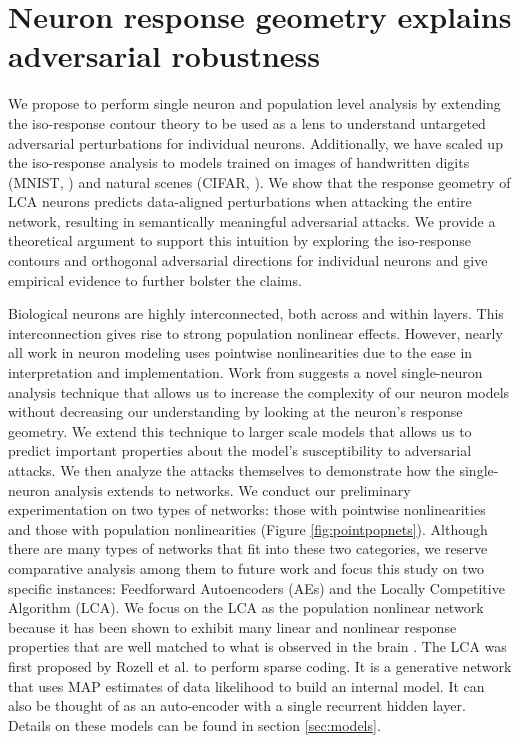 \section{Neuron response geometry explains adversarial robustness}\label{neuron}
We propose to perform single neuron and population level analysis by extending the iso-response contour theory to be used as a lens to understand untargeted adversarial perturbations for individual neurons. Additionally, we have scaled up the iso-response analysis to models trained on images of handwritten digits (MNIST, \parencite{citation}) and natural scenes (CIFAR, \parencite{citation}). We show that the response geometry of LCA neurons predicts data-aligned perturbations when attacking the entire network, resulting in semantically meaningful adversarial attacks. We provide a theoretical argument to support this intuition by exploring the iso-response contours and orthogonal adversarial directions for individual neurons and give empirical evidence to further bolster the claims. 

Biological neurons are highly interconnected, both across and within layers. This interconnection gives rise to strong population nonlinear effects. However, nearly all work in neuron modeling uses pointwise nonlinearities due to the ease in interpretation and implementation. Work from \citeyearpar{golden2016conjectures} suggests a novel single-neuron analysis technique that allows us to increase the complexity of our neuron models without decreasing our understanding by looking at the neuron’s response geometry. We extend this technique to larger scale models that allows us to predict important properties about the model’s susceptibility to adversarial attacks. We then analyze the attacks themselves to demonstrate how the single-neuron analysis extends to networks. We conduct our preliminary experimentation on two types of networks: those with pointwise nonlinearities and those with population nonlinearities (Figure \ref{fig:pointpopnets}). Although there are many types of networks that fit into these two categories, we reserve comparative analysis among them to future work and focus this study on two specific instances: Feedforward Autoencoders (AEs) and the Locally Competitive Algorithm (LCA). We focus on the LCA as the population nonlinear network because it has been shown to exhibit many linear and nonlinear response properties that are well matched to what is observed in the brain \parencite{zhu2013visual, olshausen1997sparse}. The LCA was first proposed by Rozell et al. \citeyearpar{rozell2008sparse} to perform sparse coding. It is a generative network that uses MAP estimates of data likelihood to build an internal model. It can also be thought of as an auto-encoder with a single recurrent hidden layer. Details on these models can be found in section \ref{sec:models}.


